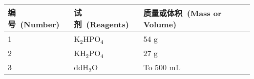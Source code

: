 \vspace{35pt}

\begin{table}[htbp]
\small
\centering
{
\par}
\begin{tabular*}{\textwidth}[c]{@{\extracolsep{\fill}}lll}
\toprule
编号\ (Number) & 试剂\ (Reagents) & 质量或体积\ (Mass or Volume)\\
\midrule
1 & K$_2$HPO$_4$ & 54 g\\
2 & KH$_2$PO$_4$ & 27 g\\
3 & ddH$_2$O & To 500 mL\\
\bottomrule
\end{tabular*}
\end{table}


